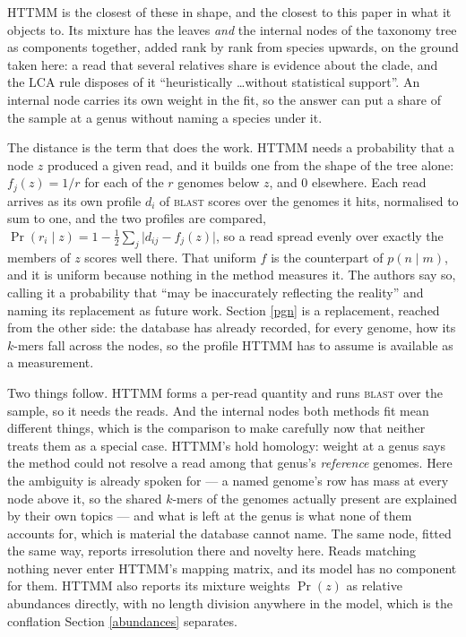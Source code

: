 \documentclass[pdflatex,sn-vancouver-num]{sn-jnl}
\begin{document}
    HTTMM \citep{httmm} is the closest of these in shape, and the closest to this paper in what it
    objects to. Its mixture has the leaves \emph{and} the internal nodes of the taxonomy tree as
    components together, added rank by rank from species upwards, on the ground taken here: a read
    that several relatives share is evidence about the clade, and the $\mathrm{LCA}$ rule disposes of
    it \enquote{heuristically \ldots without statistical support}. An internal node carries its own
    weight in the fit, so the answer can put a share of the sample at a genus without naming a
    species under it.

    The distance is the term that does the work. HTTMM needs a probability that a node $z$ produced a
    given read, and it builds one from the shape of the tree alone: $f_j(z) = 1/r$ for each of the
    $r$ genomes below $z$, and $0$ elsewhere. Each read arrives as its own profile $d_i$ of
    \textsc{blast} scores over the genomes it hits, normalised to sum to one, and the two profiles
    are compared,
    $\Pr(r_i \mid z) = 1 - \tfrac{1}{2} \sum_j \lvert d_{ij} - f_j(z) \rvert$, so a read spread
    evenly over exactly the members of $z$ scores well there. That uniform $f$ is the counterpart of
    $p(n \mid m)$, and it is uniform because nothing in the method measures it. The authors say so,
    calling it a probability that \enquote{may be inaccurately reflecting the reality} and naming its
    replacement as future work. Section \ref{pgn} is a replacement, reached from the other side: the
    database has already recorded, for every genome, how its $k$-mers fall across the nodes, so the
    profile HTTMM has to assume is available as a measurement.

    Two things follow. HTTMM forms a per-read quantity and runs \textsc{blast} over the sample, so it
    needs the reads. And the internal nodes both methods fit mean different things, which is the
    comparison to make carefully now that neither treats them as a special case. HTTMM's hold
    homology: weight at a genus says the method could not resolve a read among that genus's
    \emph{reference} genomes. Here the ambiguity is already spoken for --- a named genome's row has
    mass at every node above it, so the shared $k$-mers of the genomes actually present are explained
    by their own topics --- and what is left at the genus is what none of them accounts for, which is
    material the database cannot name. The same node, fitted the same way, reports irresolution there
    and novelty here. Reads matching nothing never enter HTTMM's mapping matrix, and its model has no
    component for them. HTTMM also reports its mixture
    weights $\Pr(z)$ as relative abundances directly, with no length division anywhere in the model,
    which is the conflation Section \ref{abundances} separates.
\end{document}
